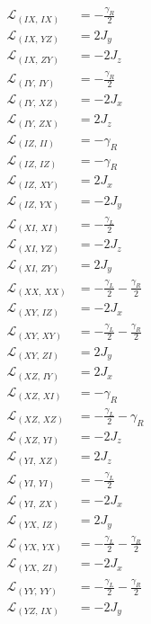 \documentclass[11pt]{article}
\begin{document}
\begin{align*}
  \mathcal{L}_{(IX,\,IX)} &= - \frac{\gamma_{R}}{2} \\
  \mathcal{L}_{(IX,\,YZ)} &= 2 J_{y} \\
  \mathcal{L}_{(IX,\,ZY)} &= - 2 J_{z} \\
  \mathcal{L}_{(IY,\,IY)} &= - \frac{\gamma_{R}}{2} \\
  \mathcal{L}_{(IY,\,XZ)} &= - 2 J_{x} \\
  \mathcal{L}_{(IY,\,ZX)} &= 2 J_{z} \\
  \mathcal{L}_{(IZ,\,II)} &= - \gamma_{R} \\
  \mathcal{L}_{(IZ,\,IZ)} &= - \gamma_{R} \\
  \mathcal{L}_{(IZ,\,XY)} &= 2 J_{x} \\
  \mathcal{L}_{(IZ,\,YX)} &= - 2 J_{y} \\
  \mathcal{L}_{(XI,\,XI)} &= - \frac{\gamma_{L}}{2} \\
  \mathcal{L}_{(XI,\,YZ)} &= - 2 J_{z} \\
  \mathcal{L}_{(XI,\,ZY)} &= 2 J_{y} \\
  \mathcal{L}_{(XX,\,XX)} &= - \frac{\gamma_{L}}{2} - \frac{\gamma_{R}}{2} \\
  \mathcal{L}_{(XY,\,IZ)} &= - 2 J_{x} \\
  \mathcal{L}_{(XY,\,XY)} &= - \frac{\gamma_{L}}{2} - \frac{\gamma_{R}}{2} \\
  \mathcal{L}_{(XY,\,ZI)} &= 2 J_{y} \\
  \mathcal{L}_{(XZ,\,IY)} &= 2 J_{x} \\
  \mathcal{L}_{(XZ,\,XI)} &= - \gamma_{R} \\
  \mathcal{L}_{(XZ,\,XZ)} &= - \frac{\gamma_{L}}{2} - \gamma_{R} \\
  \mathcal{L}_{(XZ,\,YI)} &= - 2 J_{z} \\
  \mathcal{L}_{(YI,\,XZ)} &= 2 J_{z} \\
  \mathcal{L}_{(YI,\,YI)} &= - \frac{\gamma_{L}}{2} \\
  \mathcal{L}_{(YI,\,ZX)} &= - 2 J_{x} \\
  \mathcal{L}_{(YX,\,IZ)} &= 2 J_{y} \\
  \mathcal{L}_{(YX,\,YX)} &= - \frac{\gamma_{L}}{2} - \frac{\gamma_{R}}{2} \\
  \mathcal{L}_{(YX,\,ZI)} &= - 2 J_{x} \\
  \mathcal{L}_{(YY,\,YY)} &= - \frac{\gamma_{L}}{2} - \frac{\gamma_{R}}{2} \\
  \mathcal{L}_{(YZ,\,IX)} &= - 2 J_{y} \\

\end{align*}
\end{document}
